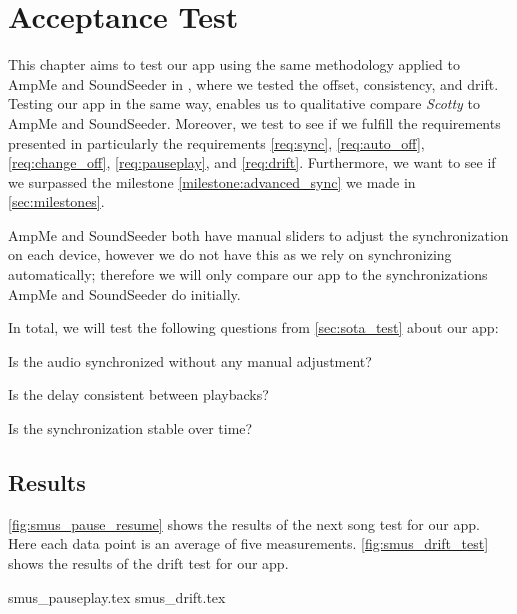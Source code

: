 \chapter{Acceptance Test}\label{cha:acctest}
This chapter aims to test our app using the same methodology applied to AmpMe and SoundSeeder in , where we tested the offset, consistency, and drift.
Testing our app in the same way, enables us to qualitative compare \textit{Scotty} to AmpMe and SoundSeeder.
Moreover, we test to see if we fulfill the requirements presented in  particularly the requirements \ref{req:sync}, \ref{req:auto_off}, \ref{req:change_off}, \ref{req:pauseplay}, and \ref{req:drift}.
Furthermore, we want to see if we surpassed the milestone \ref{milestone:advanced_sync} we made in \vref{sec:milestones}.

AmpMe and SoundSeeder both have manual sliders to adjust the synchronization on each device, however we do not have this as we rely on synchronizing automatically;
therefore we will only compare our app to the synchronizations AmpMe and SoundSeeder do initially.

In total, we will test the following questions from \vref{sec:sota_test} about our app:
\begin{enumberate}
\item Is the audio synchronized without any manual adjustment?\label{itm:is_sync?}
\item Is the delay consistent between playbacks?\label{itm:is_consistent?}
\item Is the synchronization stable over time?\label{itm:is_stable?}
\end{enumberate}

\section{Results}
\vref{fig:smus_pause_resume} shows the results of the next song test for our app.
Here each data point is an average of five measurements.
\vref{fig:smus_drift_test} shows the results of the drift test for our app.

{smus_pauseplay.tex}
{smus_drift.tex}

